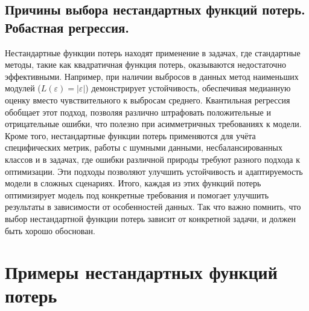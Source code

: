 \subsection*{Причины выбора нестандартных функций потерь. Робастная регрессия.}

Нестандартные функции потерь находят применение в задачах, где стандартные методы, такие как квадратичная функция потерь, оказываются недостаточно эффективными. Например, при наличии выбросов в данных метод наименьших модулей (\(L(\varepsilon) = |\varepsilon|\)) демонстрирует устойчивость, обеспечивая медианную оценку вместо чувствительного к выбросам среднего. Квантильная регрессия обобщает этот подход, позволяя различно штрафовать положительные и отрицательные ошибки, что полезно при асимметричных требованиях к модели. Кроме того, нестандартные функции потерь применяются для учёта специфических метрик, работы с шумными данными, несбалансированных классов и в задачах, где ошибки различной природы требуют разного подхода к оптимизации. Эти подходы позволяют улучшить устойчивость и адаптируемость модели в сложных сценариях. Итого, каждая из этих функций потерь оптимизирует модель под конкретные требования и помогает улучшить результаты в зависимости от особенностей данных. Так что важно помнить, что выбор нестандартной функции потерь зависит от конкретной задачи, и должен быть хорошо обоснован.


\section*{Примеры нестандартных функций потерь}

